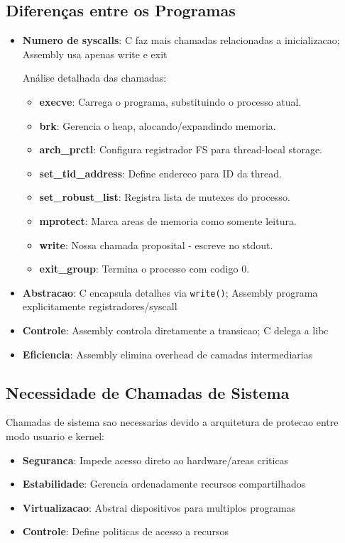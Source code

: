 \documentclass[10pt,a4paper]{article}
\begin{document}
\subsection{Diferenças entre os Programas}
\vspace{-0.2cm}
\begin{itemize}\setlength\itemsep{0pt}
  \item \textbf{Numero de syscalls}: C faz mais chamadas relacionadas a inicializacao; Assembly usa apenas write e exit

  Análise detalhada das chamadas:
  \begin{itemize}\setlength\itemsep{-2pt}
    \item \textbf{execve}: Carrega o programa, substituindo o processo atual.
    \item \textbf{brk}: Gerencia o heap, alocando/expandindo memoria.
    \item \textbf{arch\_prctl}: Configura registrador FS para thread-local storage.
    \item \textbf{set\_tid\_address}: Define endereco para ID da thread.
    \item \textbf{set\_robust\_list}: Registra lista de mutexes do processo.
    \item \textbf{mprotect}: Marca areas de memoria como somente leitura.
    \item \textbf{write}: Nossa chamada proposital - escreve no stdout.
    \item \textbf{exit\_group}: Termina o processo com codigo 0.
  \end{itemize}

  \item \textbf{Abstracao}: C encapsula detalhes via \texttt{write()}; Assembly programa explicitamente registradores/syscall
  \item \textbf{Controle}: Assembly controla diretamente a transicao; C delega a libc
  \item \textbf{Eficiencia}: Assembly elimina overhead de camadas intermediarias
\end{itemize}
\vspace{-0.2cm}

\subsection{Necessidade de Chamadas de Sistema}
\vspace{-0.2cm}
Chamadas de sistema sao necessarias devido a arquitetura de protecao entre modo usuario e kernel:
\begin{itemize}\setlength\itemsep{0pt}
  \item \textbf{Seguranca}: Impede acesso direto ao hardware/areas criticas
  \item \textbf{Estabilidade}: Gerencia ordenadamente recursos compartilhados
  \item \textbf{Virtualizacao}: Abstrai dispositivos para multiplos programas
  \item \textbf{Controle}: Define politicas de acesso a recursos
\end{itemize}
\vspace{-0.2cm}
\end{document}
